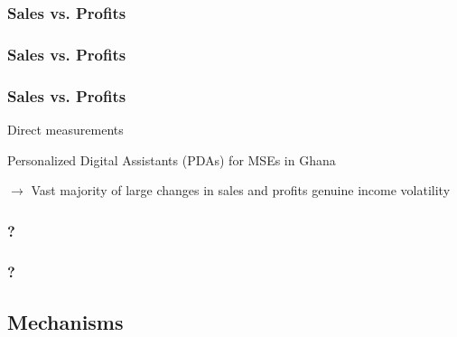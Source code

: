\documentclass[hideothersubsections, usenames,dvipsnames,11pt]{beamer}
\newenvironment{itemize_2pt}{\itemize\addtolength{\itemsep}{2pt}}{\enditemize}
\begin{document}

\begin{frame}
\frametitle{Sales vs. Profits}
	\begin{itemize_2pt}
	\item  \citep{deMel2009}
	\vspace{0.1in}
	\end{itemize_2pt}
\end{frame}

\begin{frame}
\frametitle{Sales vs. Profits}
	\begin{itemize_2pt}
	\item \citep{deMel2009}
	\vspace{0.1in}
	\end{itemize_2pt}
\end{frame}

\begin{frame}
\frametitle{Sales vs. Profits}
Direct measurements
	\begin{itemize_2pt}
	\item \citep{Fafchamps2012} Personalized Digital Assistants (PDAs) for MSEs in Ghana
	\item[] $\rightarrow$ Vast majority of large changes in sales and profits genuine income volatility
	\end{itemize_2pt}
\end{frame}


\begin{frame}
\frametitle{?}
\begin{itemize_2pt}
	\item 
	\vspace{0.1in}
\end{itemize_2pt}
\end{frame}

\begin{frame}
\frametitle{?}
\begin{itemize_2pt}
	\item 
	\vspace{0.1in}
\end{itemize_2pt}
\end{frame}


\subsection{Mechanisms}
\end{document}
